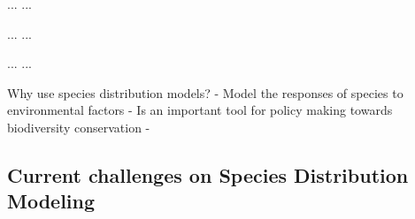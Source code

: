 \documentclass[a4paper]{article}
\begin{document}
...
...


...
...

...  ...   
 

Why use species distribution models?
  - Model the responses of species to environmental factors
  - Is an important tool for policy making towards biodiversity conservation
  - 




\subsection{Current challenges on Species Distribution Modeling}
\end{document}

